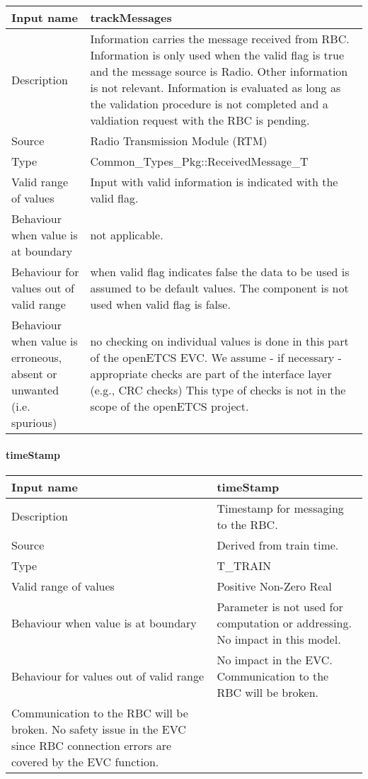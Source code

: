 \begin{longtable}{p{}p{}}
\toprule
Input name				& trackMessages \\
\midrule
Description				& Information carries the message received from RBC. Information is only used when the valid flag is true and the message source is Radio. Other information is not relevant. Information is evaluated as long as the validation procedure is not completed and a valdiation request with the RBC is pending.\\
\midrule
Source					& Radio Transmission Module (RTM)\\ 
\midrule
Type					& Common\_Types\_Pkg::ReceivedMessage\_T \\
\midrule
Valid range of values	& Input with valid information is indicated with the valid flag.\\
\midrule
Behaviour when value is at boundary	& not applicable.\\
\midrule
Behaviour for values out of valid range	& when valid flag indicates false the data to be used is assumed to be default values. The component is not used when valid flag is false.\\
\midrule
Behaviour when value is erroneous, absent or unwanted (i.e. spurious) & no checking on individual values is done in this part of the openETCS EVC. We assume - if necessary - appropriate checks are part of the interface layer (e.g., CRC checks) This type of checks is not in the scope of the openETCS project.\\

\bottomrule
\end{longtable}

\paragraph{timeStamp}

\begin{longtable}{p{}p{}}
\toprule
Input name				& timeStamp \\
\midrule
Description				& Timestamp for messaging to the RBC.\\
\midrule
Source					& Derived from train time.\\ 
\midrule
Type					& T\_TRAIN\\
\midrule
Valid range of values	& Positive Non-Zero Real\\
\midrule
Behaviour when value is at boundary	& Parameter is not used for computation or addressing. No impact in this model.\\
\midrule
Behaviour for values out of valid range	& No impact in the EVC. Communication to the RBC will be broken.\\
\midrule
Communication to the RBC will be broken. No safety issue in the EVC since RBC connection errors are covered by the EVC function.\\

\bottomrule
\end{longtable}


